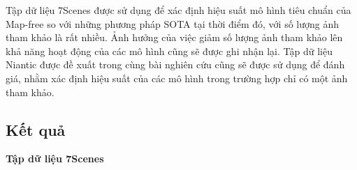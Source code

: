 Tập dữ liệu 7Scenes \cite{6619221} được sử dụng để xác định hiệu suất mô hình tiêu chuẩn của Map-free so với những phương pháp SOTA tại thời điểm đó, với số lượng ảnh tham khảo là rất nhiều. Ảnh hưởng của việc giảm số lượng ảnh tham khảo lên khả năng hoạt động của các mô hình cũng sẽ được ghi nhận lại. Tập dữ liệu Niantic \cite{arnold2022mapfree} được đề xuất trong cùng bài nghiên cứu cũng sẽ được sử dụng để đánh giá, nhằm xác định hiệu suất của các mô hình trong trường hợp chỉ có một ảnh tham khảo.


\subsection{Kết quả}
\textbf{Tập dữ liệu 7Scenes \cite{6619221}}

\begin{table}[H]
\end{table}
